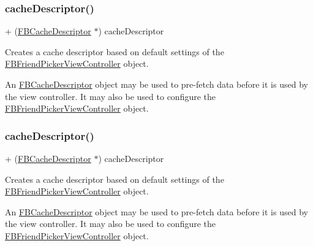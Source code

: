 \subsubsection{\texorpdfstring{cache\+Descriptor()}{cacheDescriptor()}\hspace{0.1cm}{\footnotesize\ttfamily [2/5]}}
{\footnotesize\ttfamily + (\hyperlink{interfaceFBCacheDescriptor}{F\+B\+Cache\+Descriptor} $\ast$) cache\+Descriptor \begin{DoxyParamCaption}{ }\end{DoxyParamCaption}}

Creates a cache descriptor based on default settings of the {\ttfamily \hyperlink{interfaceFBFriendPickerViewController}{F\+B\+Friend\+Picker\+View\+Controller}} object.

An {\ttfamily \hyperlink{interfaceFBCacheDescriptor}{F\+B\+Cache\+Descriptor}} object may be used to pre-\/fetch data before it is used by the view controller. It may also be used to configure the {\ttfamily \hyperlink{interfaceFBFriendPickerViewController}{F\+B\+Friend\+Picker\+View\+Controller}} object. \mbox{\label{interfaceFBFriendPickerViewController_afdb5497a310ae6cdc8ede333659a33dd}} 
\subsubsection{\texorpdfstring{cache\+Descriptor()}{cacheDescriptor()}\hspace{0.1cm}{\footnotesize\ttfamily [3/5]}}
{\footnotesize\ttfamily + (\hyperlink{interfaceFBCacheDescriptor}{F\+B\+Cache\+Descriptor} $\ast$) cache\+Descriptor \begin{DoxyParamCaption}{ }\end{DoxyParamCaption}}

Creates a cache descriptor based on default settings of the {\ttfamily \hyperlink{interfaceFBFriendPickerViewController}{F\+B\+Friend\+Picker\+View\+Controller}} object.

An {\ttfamily \hyperlink{interfaceFBCacheDescriptor}{F\+B\+Cache\+Descriptor}} object may be used to pre-\/fetch data before it is used by the view controller. It may also be used to configure the {\ttfamily \hyperlink{interfaceFBFriendPickerViewController}{F\+B\+Friend\+Picker\+View\+Controller}} object. \mbox{\label{interfaceFBFriendPickerViewController_afdb5497a310ae6cdc8ede333659a33dd}} 
